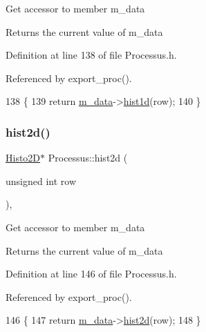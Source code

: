 Get accessor to member m\+\_\+data \begin{DoxyReturn}{Returns}
the current value of m\+\_\+data 
\end{DoxyReturn}


Definition at line 138 of file Processus.\+h.



Referenced by export\+\_\+proc().


\begin{DoxyCode}
138                                    \{
139     \textcolor{keywordflow}{return} \hyperlink{classProcessus_a3da9a9de8af54e2f47807a3e09dfccff}{m\_data}->\hyperlink{classData_a476a66728ccfc553909d15b36c22492a}{hist1d}(row);
140   \}
\end{DoxyCode}
\mbox{\label{classProcessus_a73b5118cb5f2b5eaad33286183b86cfc}} 
\subsubsection{\texorpdfstring{hist2d()}{hist2d()}}
{\footnotesize\ttfamily \hyperlink{classHisto2D}{Histo2D}$\ast$ Processus\+::hist2d (\begin{DoxyParamCaption}\item[{unsigned int}]{row }\end{DoxyParamCaption})\hspace{0.3cm}{\ttfamily [inline]}, {\ttfamily [inherited]}}

Get accessor to member m\+\_\+data \begin{DoxyReturn}{Returns}
the current value of m\+\_\+data 
\end{DoxyReturn}


Definition at line 146 of file Processus.\+h.



Referenced by export\+\_\+proc().


\begin{DoxyCode}
146                                    \{
147     \textcolor{keywordflow}{return} \hyperlink{classProcessus_a3da9a9de8af54e2f47807a3e09dfccff}{m\_data}->\hyperlink{classData_ab717ebe242192605ad509b76df35e855}{hist2d}(row);
148   \}
\end{DoxyCode}
\mbox{\label{classObject_af99145335cc61ff6e2798ea17db009d2}} 

